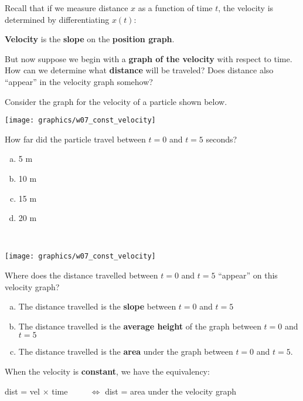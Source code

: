  Recall that if we measure distance $x$ as a function of time $t$, the
 velocity is determined by differentiating $x(t)$: 
 \begin{center}
{\bf Velocity} is the {\bf slope} on the {\bf position graph}.
 \end{center}

 But now suppose we begin with a {\bf graph of the velocity} with
 respect to time.  How can we determine what {\bf distance} will be
 traveled?  Does distance also ``appear'' in the velocity graph
 somehow?

\newpage

\problem 
 Consider the graph for the velocity of a particle shown below. 
\begin{center}
\texttt{[image: graphics/w07\_const\_velocity]}
\end{center}
How far did the particle travel between $t=0$ and $t=5$ seconds?
\begin{enumerate}[(a)]
\item 5 m\\[1ex]
\item 10 m\\[1ex]
\item 15 m\\[1ex]
\item 20 m
\end{enumerate}

\newpage
\problem 
~
\begin{center}
\texttt{[image: graphics/w07\_const\_velocity]}
\end{center}

Where does the distance travelled between $t=0$ and $t=5$ ``appear''
on this velocity graph?
\begin{enumerate}[(a)]
\item The distance travelled is the {\bf slope} between $t=0$ and $t=5$  \\[1ex]
\item The distance travelled is the {\bf average height} of the graph between $t=0$ and $t=5$  \\[1ex]
\item The distance travelled is the {\bf area} under the graph between $t=0$
  and $t=5$.
\end{enumerate}

\newpage

When the velocity is {\bf constant}, we have the equivalency:
\vspace{0.2in}
\begin{center}
dist = vel $\times$ time ~~~~ $\Longleftrightarrow$ dist = area under the velocity graph
\end{center}
\vspace{0.2in}

